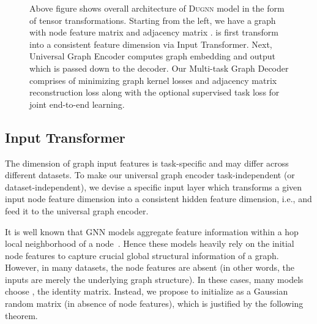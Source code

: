 \documentclass{article}
\begin{document}
\begin{figure*}[t!]
{
	}
	
	\caption{Above figure shows overall architecture of \textsc{Dugnn} model in the form of tensor transformations. Starting from the left, we have a graph  with node feature matrix  and adjacency matrix .  is first transform into a consistent feature dimension  via Input Transformer. Next, Universal Graph Encoder computes graph embedding  and   output   which is passed down to the decoder. Our Multi-task Graph Decoder  comprises of minimizing  graph kernel  losses and adjacency matrix reconstruction loss along with the optional supervised task  loss for joint end-to-end learning.
		\vspace{-1.5em}}
	\label{fig:architecture}
	
\end{figure*}


\vspace{-0.5em}
\subsection{Input Transformer}
\vspace{-0.5em}
The dimension of graph input features is task-specific and may differ across different datasets. To make our  universal graph encoder task-independent (or dataset-independent),  we   devise a   specific input layer which transforms  a given input node feature dimension  into a consistent  hidden feature dimension, i.e.,   and feed it to the universal graph encoder. 

It is well known that GNN  models  aggregate  feature information within a hop local neighborhood of a node~\cite{defferrard2016convolutional}. Hence these models heavily  rely on the  initial node features to capture crucial global structural information of a graph. However, in many datasets, the node features are absent (in other words, the inputs are merely the underlying graph structure). In these cases, many models choose , the identity matrix.  Instead, we propose to initialize  as a  Gaussian random matrix (in absence of node features), which is justified by the following theorem.
\end{document}
